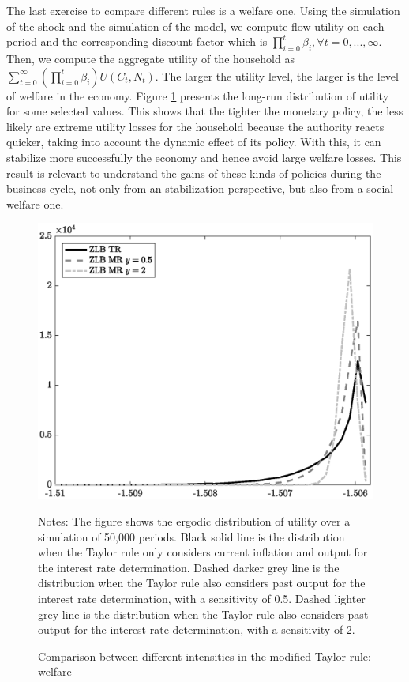 \documentclass[11pt]{article}
\numberwithin{equation}{section}
\begin{document}
The last exercise to compare different rules is a welfare one. Using the simulation of the shock and the simulation of the model, we compute flow utility on each period and the corresponding discount factor which is $\prod_{i=0}^t\beta_i, \forall t=0,...,\infty$. Then, we compute the aggregate utility of the household as $\sum_{t=0}^{\infty}(\prod_{i=0}^t\beta_i)U(C_t,N_t)$. The larger the utility level, the larger is the level of welfare in the economy. Figure \ref{fig:welfare} presents the long-run distribution of utility for some selected values. This shows that the tighter the monetary policy, the less likely are extreme utility losses for the household because the authority reacts quicker, taking into account the dynamic effect of its policy. With this, it can stabilize more successfully the economy and hence avoid large welfare losses. This result is relevant to understand the gains of these kinds of policies during the business cycle, not only from an stabilization perspective, but also from a social welfare one.

%

\begin{figure}[H]
	\centering
	\caption{Comparison between different intensities in the modified Taylor rule: welfare}\label{fig:welfare}
	\includegraphics[scale=.6]{welfare}
	\begin{minipage}{\linewidth}
    	\vspace{1mm}
		\footnotesize{{\sc Notes:} The figure shows the ergodic distribution of utility over a simulation of 50,000 periods. Black solid line is the distribution when the Taylor rule only considers current inflation and output for the interest rate determination. Dashed darker grey line is the distribution when the Taylor rule also considers past output for the interest rate determination, with a sensitivity of 0.5. Dashed lighter grey line is the distribution when the Taylor rule also considers past output for the interest rate determination, with a sensitivity of 2.}
	\end{minipage}
\end{figure}
\end{document}
